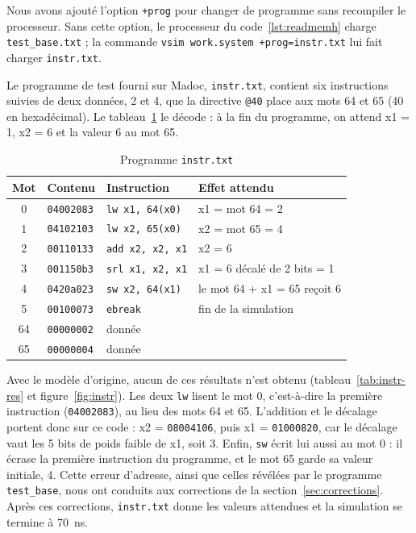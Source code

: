Nous avons ajouté l'option \texttt{+prog} pour changer de programme sans recompiler le
processeur. Sans cette option, le processeur du code~\ref{lst:readmemh} charge
\texttt{test\_base.txt} ; la commande \texttt{vsim work.system +prog=instr.txt} lui fait charger
\texttt{instr.txt}.

Le programme de test fourni sur Madoc, \texttt{instr.txt}, contient six instructions suivies
de deux données, 2 et 4, que la directive \texttt{@40} place aux mots 64 et 65 (40 en
hexadécimal). Le tableau~\ref{tab:instr} le décode : à la fin du programme, on attend x1 = 1,
x2 = 6 et la valeur 6 au mot 65.

\begin{table}[H]
\centering
\begin{tabular}{clll}
\toprule
Mot & Contenu & Instruction & Effet attendu \\
\midrule
0  & \texttt{04002083} & \texttt{lw x1, 64(x0)}  & x1 = mot 64 = 2 \\
1  & \texttt{04102103} & \texttt{lw x2, 65(x0)}  & x2 = mot 65 = 4 \\
2  & \texttt{00110133} & \texttt{add x2, x2, x1} & x2 = 6 \\
3  & \texttt{001150b3} & \texttt{srl x1, x2, x1} & x1 = 6 décalé de 2 bits = 1 \\
4  & \texttt{0420a023} & \texttt{sw x2, 64(x1)}  & le mot 64 + x1 = 65 reçoit 6 \\
5  & \texttt{00100073} & \texttt{ebreak}         & fin de la simulation \\
\midrule
64 & \texttt{00000002} & donnée & \\
65 & \texttt{00000004} & donnée & \\
\bottomrule
\end{tabular}
\caption{Programme \texttt{instr.txt}}
\label{tab:instr}
\end{table}

Avec le modèle d'origine, aucun de ces résultats n'est obtenu (tableau~\ref{tab:instr-res} et
figure~\ref{fig:instr}).
Les deux \texttt{lw} lisent le mot 0, c'est-à-dire la première instruction
(\texttt{04002083}), au lieu des mots 64 et 65. L'addition et le décalage portent donc sur ce
code : x2 = \texttt{08004106}, puis x1 = \texttt{01000820}, car le décalage vaut les 5 bits
de poids faible de x1, soit 3. Enfin, \texttt{sw} écrit lui aussi au mot 0 : il écrase la
première instruction du programme, et le mot 65 garde sa valeur initiale, 4. Cette erreur
d'adresse, ainsi que celles révélées par le programme \texttt{test\_base}, nous ont conduits
aux corrections de la section~\ref{sec:corrections}. Après ces corrections, \texttt{instr.txt}
donne les valeurs attendues et la simulation se termine à 70~ns.

